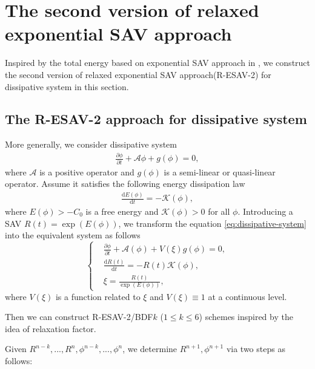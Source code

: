 \documentclass[final,review,onefignum,onetabnum]{siamart190516}
\theoremstyle{plain}
\begin{document}
\section{The second version of relaxed exponential SAV approach}
\label{sec:R-ESAV-2}
Inspired by the total energy based on exponential SAV approach in \cite{liu2021highly}, we construct the second version of relaxed exponential SAV approach(R-ESAV-2) for dissipative system in this section.


\subsection{The R-ESAV-2 approach for dissipative system}
More generally, we consider dissipative system
\begin{align}\label{eq:dissipative-system}
 \frac{\partial \phi}{\partial t}+\mathcal{A} \phi +g(\phi)=0, 
\end{align} 
where $\mathcal{A}$ is a positive operator and $g(\phi)$ is a semi-linear or quasi-linear operator. Assume it  satisfies the following energy dissipation law
\begin{align}
	\frac{\mathrm{d} E(\phi)}{\mathrm{d} t} =-\mathcal{K}(\phi),\label{eq: new2}
\end{align} 
where $E(\phi)>-C_{0}$ is a free energy and $\mathcal{K}(\phi)>0$ for all $\phi$.
Introducing a SAV $R(t)=\exp\left(E(\phi)\right)$, we transform the equation \eqref{eq:dissipative-system} into the equivalent system as follows
\begin{equation}\label{eq:dissipative-system-ESAV}
\left\{\begin{aligned}
& \frac{\partial \phi}{\partial t}+\mathcal{A} (\phi)+V(\xi)g(\phi)=0, \\
& \frac{\mathrm{d} R(t)}{\mathrm{d} t}=-R(t)\mathcal{K}(\phi),\\
& \xi = \frac{R(t)}{\exp\left(E(\phi)\right)},
\end{aligned}\right.
\end{equation}
where $V(\xi)$ is a function related to $\xi$ and $V(\xi) \equiv 1$ at a continuous level. 

Then we can construct R-ESAV-2/BDF$k$ ($1 \leq k \leq 6$) schemes inspired by the idea of relaxation factor.

Given $R^{n-k}, ..., R^{n}, \phi^{n-k}, ..., \phi^{n}$, we determine $R^{n+1}, \phi^{n+1}$ via two steps as follows:
\end{document}
